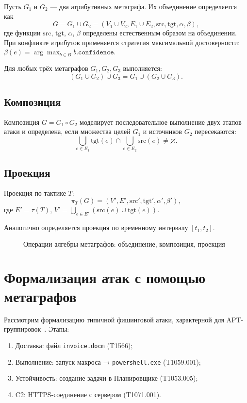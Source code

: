 \documentclass{article}
\begin{document}
Пусть $G_1$ и $G_2$ — два атрибутивных метаграфа. Их объединение определяется как
\[
    G = G_1 \cup G_2 = (V_1 \cup V_2, E_1 \cup E_2, \mathrm{src}, \mathrm{tgt}, \alpha, \beta),
\]
где функции $\mathrm{src}$, $\mathrm{tgt}$, $\alpha$, $\beta$ определены естественным образом на объединении. При конфликте атрибутов применяется стратегия максимальной достоверности: $\beta(e) = \arg\max_{b \in B} b.\texttt{confidence}$.

\begin{theorem}
    Для любых трёх метаграфов $G_1, G_2, G_3$ выполняется:
    \[
        (G_1 \cup G_2) \cup G_3 = G_1 \cup (G_2 \cup G_3).
    \]
\end{theorem}

\subsection{Композиция}

Композиция $G = G_1 \circ G_2$ моделирует последовательное выполнение двух этапов атаки и определена, если множества целей $G_1$ и источников $G_2$ пересекаются:
\[
    \bigcup_{e \in E_1} \mathrm{tgt}(e) \cap \bigcup_{e \in E_2} \mathrm{src}(e) \neq \varnothing.
\]

\subsection{Проекция}

Проекция по тактике $T$:
\[
    \pi_T(G) = (V', E', \mathrm{src}', \mathrm{tgt}', \alpha', \beta'),
\]
где $E' = \tau(T)$, $V' = \bigcup_{e \in E'} (\mathrm{src}(e) \cup \mathrm{tgt}(e))$.

Аналогично определяется проекция по временному интервалу $[t_1, t_2]$.

\begin{figure}[H]
    \label{fig:algebra-ops}
    \caption{Операции алгебры метаграфов: объединение, композиция, проекция}
\end{figure}

\section{Формализация атак с помощью метаграфов}\label{sec:ch2/sec5}

Рассмотрим формализацию типичной фишинговой атаки, характерной для APT-группировок~\cite{Latypov2020}. Этапы:
\begin{enumerate}
    \item Доставка: файл \texttt{invoice.docm} (T1566);
    \item Выполнение: запуск макроса → \texttt{powershell.exe} (T1059.001);
    \item Устойчивость: создание задачи в Планировщике (T1053.005);
    \item C2: HTTPS-соединение с сервером (T1071.001).
\end{enumerate}
\end{document}
